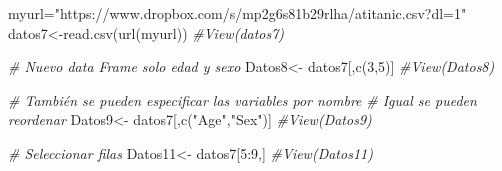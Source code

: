 \documentclass[
]{article}
\newenvironment{Shaded}{\begin{snugshade}}{\end{snugshade}}
\newcommand{\CommentTok}[1]{\textcolor[rgb]{0.56,0.35,0.01}{\textit{#1}}}
\newcommand{\ConstantTok}[1]{\textcolor[rgb]{0.00,0.00,0.00}{#1}}
\newcommand{\DecValTok}[1]{\textcolor[rgb]{0.00,0.00,0.81}{#1}}
\newcommand{\FunctionTok}[1]{\textcolor[rgb]{0.00,0.00,0.00}{#1}}
\newcommand{\NormalTok}[1]{#1}
\newcommand{\OtherTok}[1]{\textcolor[rgb]{0.56,0.35,0.01}{#1}}
\newcommand{\SpecialCharTok}[1]{\textcolor[rgb]{0.00,0.00,0.00}{#1}}
\newcommand{\StringTok}[1]{\textcolor[rgb]{0.31,0.60,0.02}{#1}}
\begin{document}
\begin{Shaded}
\begin{Highlighting}[]
\NormalTok{myurl}\OtherTok{=}\StringTok{"https://www.dropbox.com/s/mp2g6s81b29rlha/atitanic.csv?dl=1"}
\NormalTok{datos7}\OtherTok{\textless{}{-}}\FunctionTok{read.csv}\NormalTok{(}\FunctionTok{url}\NormalTok{(myurl))}
\CommentTok{\#View(datos7)}
\end{Highlighting}
\end{Shaded}

\begin{Shaded}
\begin{Highlighting}[]
\CommentTok{\# Nuevo data Frame solo edad y sexo}
\NormalTok{Datos8}\OtherTok{\textless{}{-}}\NormalTok{ datos7[,}\FunctionTok{c}\NormalTok{(}\DecValTok{3}\NormalTok{,}\DecValTok{5}\NormalTok{)]}
\CommentTok{\#View(Datos8)}
\end{Highlighting}
\end{Shaded}

\begin{Shaded}
\begin{Highlighting}[]
\CommentTok{\# También se pueden especificar las variables por nombre}
\CommentTok{\# Igual se pueden reordenar}
\NormalTok{Datos9}\OtherTok{\textless{}{-}}\NormalTok{ datos7[,}\FunctionTok{c}\NormalTok{(}\StringTok{"Age"}\NormalTok{,}\StringTok{"Sex"}\NormalTok{)]}
\CommentTok{\#View(Datos9)}
\end{Highlighting}
\end{Shaded}

\begin{Shaded}
\end{Shaded}

\begin{Shaded}
\begin{Highlighting}[]
\CommentTok{\# Seleccionar filas}
\NormalTok{Datos11}\OtherTok{\textless{}{-}}\NormalTok{ datos7[}\DecValTok{5}\SpecialCharTok{:}\DecValTok{9}\NormalTok{,]}
\CommentTok{\#View(Datos11)}
\end{Highlighting}
\end{Shaded}
\end{document}
